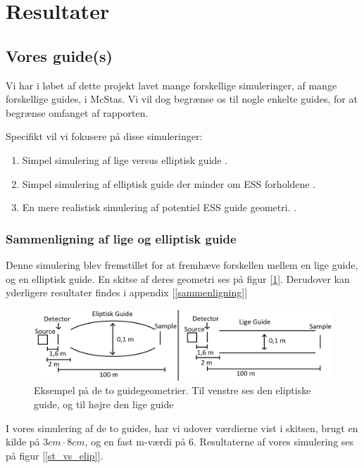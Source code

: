\documentclass[12pt,oneside,a4paper]{article}
\begin{document}
{{{{{\section{Resultater}

\subsection{Vores guide(s)}
Vi har i løbet af dette projekt lavet mange forskellige simuleringer, af mange forskellige guides, i McStas. Vi vil dog begrænse os til nogle enkelte guides, for at begrænse omfanget af rapporten.

Specifikt vil vi fokusere på disse simuleringer:
\begin{enumerate}
    \item Simpel simulering af lige versus elliptisk guide \cite{github:st_vs_el}.
    \item Simpel simulering af elliptisk guide der minder om ESS forholdene \cite{github:ess_sim_simple}.
    \item En mere realistisk simulering af potentiel ESS guide geometri. \cite{github:ess_brill_optimized}.
\end{enumerate}

\subsubsection{Sammenligning af lige og elliptisk guide}
Denne simulering blev fremstillet for at fremhæve forskellen mellem en lige guide, og en elliptisk guide. En skitse af deres geometri ses på figur [\ref{lige_mod_eliptisk}]. Derudover kan yderligere resultater findes i appendix [\ref{sammenligning}]

\begin{figure}[H] 
\centering
\includegraphics[width=1\textwidth]{Straight_VS_Elipse.png}
\caption{Eksempel på de to guidegeometrier. Til venstre ses den eliptiske guide, og til højre den lige guide} \label{lige_mod_eliptisk}
\end{figure}

I vores simulering af de to guides, har vi udover værdierne vist i skitsen, brugt en kilde på $3cm\cdot8cm$, og en fast m-værdi på 6. Resultaterne af vores simulering ses på figur [\ref{st_vs_elip}].

}}}}}
\end{document}
